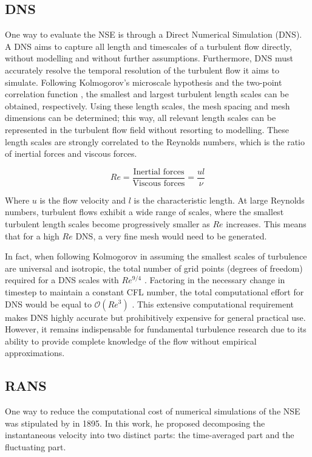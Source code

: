 \subsection{DNS}
One way to evaluate the NSE is through a Direct Numerical Simulation (DNS). A DNS aims to capture all length and timescales of a turbulent flow directly, without modelling and without further assumptions. Furthermore, DNS must accurately resolve the temporal resolution of the turbulent flow it aims to simulate. Following Kolmogorov's microscale hypothesis \cite{Kolmogorov1941} and the two-point correlation function \cite{Pope2000}, the smallest and largest turbulent length scales can be obtained, respectively. Using these length scales, the mesh spacing and mesh dimensions can be determined; this way, all relevant length scales can be represented in the turbulent flow field without resorting to modelling. These length scales are strongly correlated to the Reynolds numbers, which is the ratio of inertial forces and viscous forces. 

\begin{equation}\label{eq: Reynoldsnr}
    Re = \frac{\text{Inertial forces}}{\text{Viscous forces}}= \frac{u l}{\nu}
\end{equation}

Where $u$ is the flow velocity and $l$ is the characteristic length. At large Reynolds numbers, turbulent flows exhibit a wide range of scales, where the smallest turbulent length scales become progressively smaller as $Re$ increases. This means that for a high $Re$ DNS, a very fine mesh would need to be generated. 

In fact, when following Kolmogorov in assuming the smallest scales of turbulence are universal and isotropic, the total number of grid points (degrees of freedom) required for a DNS scales with $Re^{9/4}$ \cite{Coleman2010}. Factoring in the necessary change in timestep to maintain a constant CFL number, the total computational effort for DNS would be equal to $\mathcal{O}(Re^3)$ \cite{Coleman2010}. This extensive computational requirement makes DNS highly accurate but prohibitively expensive for general practical use. However, it remains indispensable for fundamental turbulence research due to its ability to provide complete knowledge of the flow without empirical approximations.


\subsection{RANS}
One way to reduce the computational cost of numerical simulations of the NSE was stipulated by \textcite{Reynolds1895} in 1895. In this work, he proposed decomposing the instantaneous velocity into two distinct parts: the time-averaged part and the fluctuating part. 

